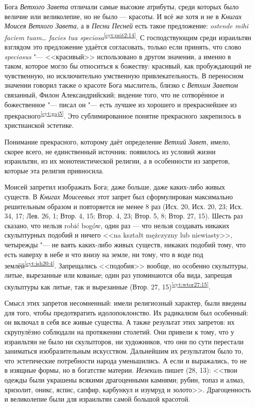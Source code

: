 Бога \emph{Ветхого Завета} отличали самые высокие атрибуты, среди которых было величие или великолепие, но не было --- красоты. И всё же хотя и не в \emph{Книгах Моисея} \emph{Ветхого Завета}, а в \emph{Песни Песней} есть такое предложение: {\sl ostende mihi faciem tuam… facies tua speciosa}\textsuperscript{\ref{cyt:prit2:14}}. С господствующим среди израильтян взглядом это предложение удаётся согласовать, только если принять, что слово {\sl speciosus} "--- <<красивый>> использовано в другом значении, а именно в таком, которое могло бы относиться к божеству: красивый, как пробуждающий не чувственную, но исключительно умственную привлекательность. В переносном значении говорил также о красоте Бога мыслитель, близко с \emph{Ветхим Заветом} связанный, Филон Александрийский; видение того, что не сотворённое и божественное "--- писал он "--- есть лучшее из хорошего и прекраснейшее из прекрасного\textsuperscript{\ref{cyt:gaj5}}. Это сублимированное понятие прекрасного закрепилось в христианской эстетике.

Понимание прекрасного, которому даёт определение \emph{Ветхий Завет}, имело, скорее всего, не единственный источник: появилось из условий жизни израильтян, из их монотеистической религии, а в особенности из запретов, которые эта религия привносила.

Моисей запретил изображать Бога; даже больше, даже каких-либо живых существ. В \emph{Книгах Моисеевых} этот запрет был сформулирован максимально решительным образом и повторяется не менее 8 раз (Исх. 20, Исх. 20, 23; Исх. 34, 17; Лев. 26, 1; Втор. 4, 15; Втор. 4, 23; Втор. 5, 8; Втор. 27, 15). Шесть раз сказано, что нельзя robić bogów, один раз --- что нельзя создавать никаких скульптурных подобий и ничего <<na kształt mężczyzny lub niewiasty>>, четырежды "--- не ваять каких-либо живых существ, никаких подобий тому, что есть наверху в небе и что внизу на земле, ни тому, что в воде под землёй\textsuperscript{\ref{cyt:ish20:4}}. Запрещались <<подобия>> вообще, но особенно скульптуры, литые, вырезанные или кованые; один раз упоминаются оба вида, запрещая скульптуры как литые, так и вырезанные (Втор. 27, 15)\textsuperscript{\ref{cyt:wtor27:15}}.

Смысл этих запретов несомненный: имели религиозный характер, были введены для того, чтобы предотвратить идолопоклонство. Их радикализм был особенный: он включал в себя все живые существа. А также результат этих запретов: их скрупулёзно соблюдали на протяжении столетий. Они привели к тому, что у израильтян не было ни скульпторов, ни художников, что они по сути перестали заниматься изобразительным искусством. Дальнейшим их результатом было то, что эстетические потребности народа уменьшились. А если и выражались, то не в изящные формы, но в богатстве материи. \emph{Иезекиль} пишет (28, 13): <<твои одежды были украшены всякими драгоценными камнями; рубин, топаз и алмаз, хризолит, оникс, яспис, сапфир, карбункул и изумруд и золото>>. Драгоценность и великолепие были для израильтян самой большой красотой.

